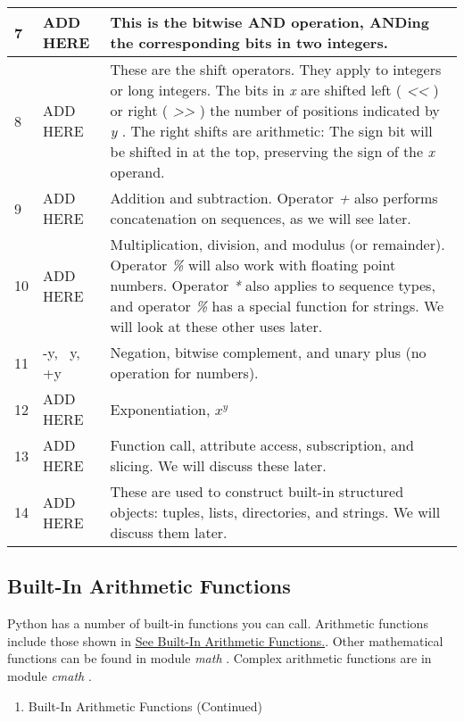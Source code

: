 \begin{longtable}{|l|l|p{7cm}|}
  7 & ADD HERE & This is the bitwise AND operation,
ANDing the corresponding bits in two integers. \\
%
\midrule

8 & ADD HERE & These are the shift operators.
They apply to integers or long integers. The bits in \emph{x} are
shifted left ( \emph{\textless{}\textless{}} ) or right (
\emph{\textgreater{}\textgreater{}} ) the number of positions indicated
by \emph{y} . The right shifts are arithmetic: The sign bit will be
shifted in at the top, preserving the sign of the \emph{x} operand. \\
%
\midrule
9 & ADD HERE & Addition and subtraction. Operator
\emph{+} also performs concatenation on sequences, as we will see later.\\
%
\midrule
10 & ADD HERE & Multiplication, division, and
modulus (or remainder). Operator \emph{\%} will also work with floating
point numbers. Operator \emph{*} also applies to sequence types, and
operator \emph{\%} has a special function for strings. We will look at
these other uses later.\\
%
\midrule
11 & -y, ~y, +y & Negation, bitwise complement, and
unary plus (no operation for numbers).\\
%
\midrule
12 & ADD HERE & Exponentiation, $x^y$ \\
%
\midrule
13 & ADD HERE & Function call, attribute access,
subscription, and slicing. We will discuss these later. \\
%
\midrule
14 & ADD HERE & These are used to construct
built-in structured objects: tuples, lists, directories, and strings. We
will discuss them later. \\
%
\bottomrule
\end{longtable}






\subsection{Built-In Arithmetic Functions}
\label{built-in-arithmetic-functions}

Python has a number of built-in
functions you can call. Arithmetic functions include those shown in
\href{chap2.html\#32777}{See Built-In Arithmetic Functions.}. Other
mathematical functions can be found in module \emph{math} . Complex
arithmetic functions are in module \emph{cmath} .

\begin{enumerate}

\item
  Built-In Arithmetic Functions (Continued)
\end{enumerate}

